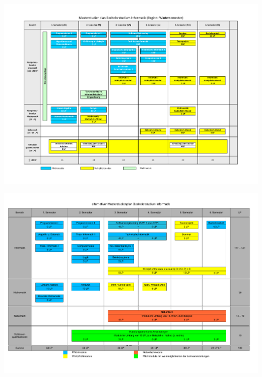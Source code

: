 \documentclass[]{papertex}
\begin{document}
		
		
		\newpage
		\begin{multicols}{2}
		
		
		\end{multicols}
		\begin{minipage}{1.0\linewidth}
			\begin{center}     
			\label{musterstudienplan}
			\includegraphics[angle=90, totalheight=\textheight, width=\textwidth ]{bilder/studienplan_bsc_ws/Musterstudienplan_BScInformatik_WS.pdf}
			\end{center}  
		\end{minipage}
		\newpage
		\begin{minipage}{1.0\linewidth}
		\begin{center} 
  			\includegraphics[angle=90,totalheight=\textheight, width=\textwidth ]{bilder/studienplan_bsc_ws/studienplan_bsc.pdf}
  			\label{studienplan_neu}
		\end{center}
		\end{minipage}
	
	\begin{multicols}{2} 
	
	\end{multicols}
	\newpage
\end{document}
